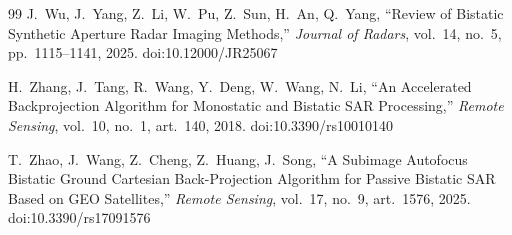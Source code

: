 \documentclass[11pt,a4paper]{article}
\begin{document}
\begin{thebibliography}{99}
 J.~Wu, J.~Yang, Z.~Li, W.~Pu, Z.~Sun, H.~An, Q.~Yang, ``Review of Bistatic Synthetic Aperture Radar Imaging Methods,'' \emph{Journal of Radars}, vol.~14, no.~5, pp.~1115--1141, 2025. doi:10.12000/JR25067

 H.~Zhang, J.~Tang, R.~Wang, Y.~Deng, W.~Wang, N.~Li, ``An Accelerated Backprojection Algorithm for Monostatic and Bistatic SAR Processing,'' \emph{Remote Sensing}, vol.~10, no.~1, art.~140, 2018. doi:10.3390/rs10010140

 T.~Zhao, J.~Wang, Z.~Cheng, Z.~Huang, J.~Song, ``A Subimage Autofocus Bistatic Ground Cartesian Back-Projection Algorithm for Passive Bistatic SAR Based on GEO Satellites,'' \emph{Remote Sensing}, vol.~17, no.~9, art.~1576, 2025. doi:10.3390/rs17091576

\end{thebibliography}
\end{document}
